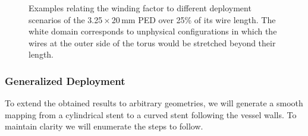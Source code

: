 \begin{figure}[hb]
	\centering
	\vspace*{-0.25cm}
	
	\vspace*{-1cm}
	\caption[Visualization of winding factor]{Examples relating the winding factor to different deployment scenarios of the 3.25\,$\times$\,20\,mm PED over 25\% of its wire length. The white domain corresponds to unphysical configurations in which the wires at the outer side of the torus would be stretched beyond their length.}\label{fig:example_Ks}
\end{figure}

\subsubsection*{Generalized Deployment}
To extend the obtained results to arbitrary geometries, we will generate a smooth mapping from a cylindrical stent to a curved stent following the vessel walls. To maintain clarity we will enumerate the steps to follow.
